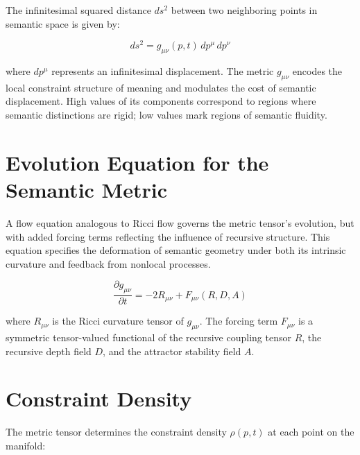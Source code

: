 The infinitesimal squared distance \(ds^2\) between two neighboring points in semantic space is given by:

\begin{equation}
ds^2 = g_{\mu\nu}(p, t) \, dp^\mu \, dp^\nu
\end{equation}

where \(dp^\mu\) represents an infinitesimal displacement. The metric \(g_{\mu\nu}\) encodes the local constraint structure of meaning and modulates the cost of semantic displacement. High values of its components correspond to regions where semantic distinctions are rigid; low values mark regions of semantic fluidity.


\section{Evolution Equation for the Semantic Metric}
\label{3.3:evolution_equation_for_the_semantic_metric}

A flow equation analogous to Ricci flow \autocite{Hamilton1982, Perelman2002, RicciLeviCivita1901} governs the metric tensor's evolution, but with added forcing terms reflecting the influence of recursive structure. This equation specifies the deformation of semantic geometry under both its intrinsic curvature and feedback from nonlocal processes.

\begin{equation}\label{eq:metric_evolution}
\frac{\partial g_{\mu\nu}}{\partial t} = -2 R_{\mu\nu} + F_{\mu\nu}(R, D, A)
\end{equation}

where \(R_{\mu\nu}\) is the Ricci curvature tensor of \(g_{\mu\nu}\). The forcing term \(F_{\mu\nu}\) is a symmetric tensor-valued functional of the recursive coupling tensor \(R\), the recursive depth field \(D\), and the attractor stability field \(A\).


\section{Constraint Density}
\label{3.4:constraint_density}

The metric tensor determines the constraint density \(\rho(p, t)\) at each point on the manifold:

